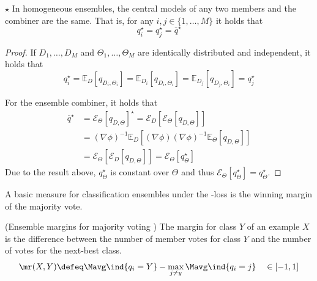 \documentclass[
	twoside=false, %
]{kaobook}
\begin{document}
\begin{lemma}
 \label{thm:qstars-same} 
  $\star$ In homogeneous ensembles, the central models of any two members and the combiner are the same. That is, for any $i, j \in \{ 1, \dots, M \}$ it holds that
$$
q_{i}^\star = q_{j}^\star = \bar{q}^\star
$$
\end{lemma}
\begin{proof}
If $D_{1}, \dots, D_{M}$ and $\Theta_{1}, \dots, \Theta_{M}$ are identically distributed and independent, it holds that
$$
q_{i}^\star = \mathbb{E}_{D}\left[ q_{D_{i}, \Theta_{i}} \right]  = \mathbb{E}_{D_{i}}\left[ q_{D_{i}, \Theta_{i}} \right]  
= \mathbb{E}_{D_{j}}\left[ q_{D_{j}, \Theta_{i}} \right] = q_{j}^\star
$$

For the ensemble combiner, it holds that
\begin{align*}
\bar{q}^\star &= \mathcal{E}_{\Theta}\left[ q_{D,\Theta} \right] ^\star = \mathcal{E}_{D}\left[ \mathcal{E}_{\Theta}\left[ q_{D,\Theta} \right]   \right] \\
&= (\nabla \phi)^{-1} \mathbb{E}_{D}\left[ (\nabla \phi) (\nabla \phi)^{-1} \mathbb{E}_{\Theta}\left[ q_{D,\Theta} \right]   \right] \\
&= \mathcal{E}_{\Theta}\left[ \mathcal{E}_{D}\left[ q_{D, \Theta} \right]  \right] = \mathcal{E}_{\Theta}\left[ q_{\Theta}^\star \right] 
\end{align*}
Due to the result above, $q_{\Theta}^\star$ is constant over $\Theta$ and thus $\mathcal{E}_{\Theta}\left[ q_{\Theta}^\star \right] = q_{\Theta}^\star$.
\end{proof}

A basic measure for classification ensembles under the \zeroone-loss is the winning margin of the majority vote.
\begin{definition} (Ensemble margins for majority voting \cite{breiman_RandomForests_2001})
The margin for class $Y$ of an example $X$ is the difference between the number of member votes for class $Y$ and the number of votes for the next-best class.
	$$
\mr(X,Y) \defeq \Mavg \ind{q_{i} = Y} - \max_{j \neq y} \Mavg \ind{q_{i} = j} \hspace{1em} \in [-1, 1]
$$
\label{def:ensemble-margin}
\end{definition}
\end{document}

